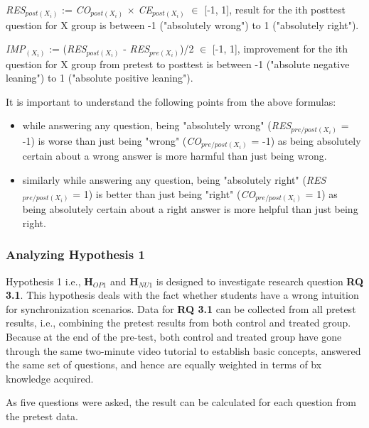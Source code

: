 \textit{RES$_{post(X_i)}$} := \textit{CO$_{post(X_i)}$} $\times$ \textit{CE$_{post(X_i)}$} $\in$ [-1,  1], result for the ith posttest question for X group is between -1 ("absolutely wrong") to 1 ("absolutely right").

\textit{IMP$_{(X_i)}$} := (\textit{RES$_{post(X_i)}$} - \textit{RES$_{pre(X_i)}$})/2 $\in$ [-1,  1], improvement for the ith question for X group from pretest to posttest is between -1 ("absolute negative leaning") to 1 ("absolute positive leaning").

It is important to understand the following points from the above formulas:
\begin{itemize}
	\item while answering any question, being "absolutely wrong" (\textit{RES$_{pre/post(X_i)}$} = -1) is worse than just being "wrong" (\textit{CO$_{pre/post(X_i)}$} = -1) as being absolutely certain about a wrong answer is more harmful than just being wrong.
	\item similarly while answering any question, being "absolutely right" (\textit{RES$_{pre/post(X_i)}$} = 1) is better than just being "right" (\textit{CO$_{pre/post(X_i)}$} = 1) as being absolutely certain about a right answer is more helpful than just being right.
\end{itemize} 

\subsubsection{Analyzing Hypothesis 1}\label{subsubsec:hypothesis1}
Hypothesis 1 i.e., \textbf{H$_{OP1}$} and \textbf{H$_{NU1}$} is designed to investigate research question \textbf{RQ 3.1}. This hypothesis deals with the fact whether students have a wrong intuition for synchronization scenarios. Data for \textbf{RQ 3.1} can be collected from all pretest results, i.e., combining the pretest results from both control and treated group. Because at the end of the pre-test, both control and treated group have gone through the same two-minute video tutorial to establish basic concepts, answered the same set of questions, and hence are equally weighted in terms of bx knowledge acquired.

As five questions were asked, the result can be calculated for each question from the pretest data. 

